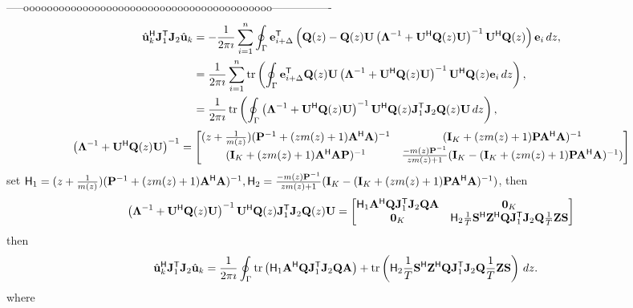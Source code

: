 \documentclass[11pt,a4paper]{article}
\begin{document}
-----oooooooooooooooooooooooooooooooooooooooooo----------------
\begin{align*}
		\hat \uu_k^\H \J_1^\T \J_2 \hat \uu_k &= -\frac1{2 \pi \imath} \sum_{i=1}^n \oint_{\Gamma} \ee_{i + \Delta}^\T \left(  \Q(z) - \Q(z) \U \left( \bLambda^{-1} + \U^\H \Q(z) \U \right)^{-1} \U^\H \Q(z) \right) \ee_{i}\,dz, \\ 
		&=\frac1{2 \pi \imath} \sum_{i=1}^n \tr \left(  \oint_{\Gamma} \ee_{i + \Delta}^\T \Q(z) \U \left( \bLambda^{-1} + \U^\H \Q(z) \U \right)^{-1} \U^\H \Q(z) \ee_{i}\,dz \right), \\ 
		&=\frac1{2 \pi \imath} \tr \left( \oint_{\Gamma} \left( \bLambda^{-1} + \U^\H \Q(z) \U \right)^{-1} \U^\H \Q(z) \J_1^\T \J_2 \Q(z) \U\,dz \right),
\end{align*}
\begin{equation}
    \left( \bLambda^{-1} + \U^\H \Q(z) \U \right)^{-1} = \begin{bmatrix} (z+\frac{1}{m(z)})(\P^{-1} + (zm(z)+1)\A^ \H \A)^{-1} & (\I_K+(zm(z)+1)\P \A^ \H \A)^{-1} \\ (\I_K+(zm(z)+1) \A^ \H \A \P)^{-1} & \frac{-m(z)\P^{-1}}{zm(z)+1}(\I_K-(\I_K+(zm(z)+1)\P \A^ \H \A)^{-1}) \end{bmatrix}
\end{equation}
set $\H_1=(z+\frac{1}{m(z)})(\P^{-1} + (zm(z)+1)\A^ \H \A)^{-1}, \H_2= \frac{-m(z)\P^{-1}}{zm(z)+1}(\I_K-(\I_K+(zm(z)+1)\P \A^ \H \A)^{-1})$, then 
\begin{align*}
    \left( \bLambda^{-1} + \U^\H \Q(z) \U \right)^{-1} \U^\H \Q(z) \J_1^\T \J_2 \Q(z) \U = \begin{bmatrix}
        \H_1 \A^\H \Q \J_1^\T \J_2 \Q \A & \zo_K \\
        \zo_K & \H_2 \frac1T \S^\H \Z^\H \Q \J_1^\T \J_2 \Q \frac1T \Z \S
    \end{bmatrix}
\end{align*}
then
\begin{align*}
    \hat \uu_k^\H \J_1^\T \J_2 \hat \uu_k &= \frac1{2 \pi \imath}  \oint_{\Gamma} \tr \left( \H_1 \A^\H \Q\J_1^\T \J_2 \Q \A \right) + \tr \left( \H_2 \frac1T \S^\H \Z^\H \Q \J_1^\T \J_2 \Q \frac1T \Z \S \right) \,dz .
\end{align*}
where
\end{document}
